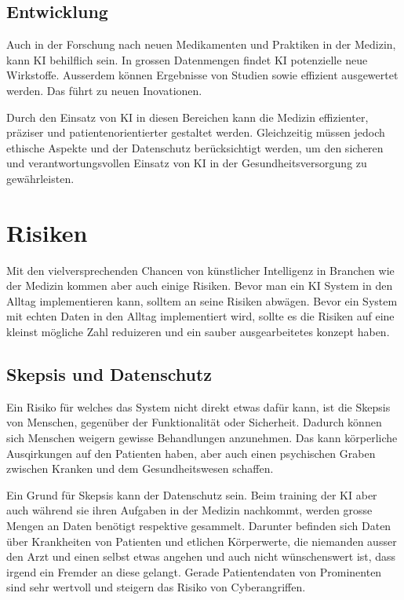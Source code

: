\subsection{\normalsize{Entwicklung}}
Auch in der Forschung nach neuen Medikamenten und Praktiken in der Medizin, kann KI behilflich sein. In grossen Datenmengen findet KI potenzielle neue Wirkstoffe.
Ausserdem können Ergebnisse von Studien sowie effizient ausgewertet werden. Das führt zu neuen Inovationen.

\vspace{3mm} \noindent
Durch den Einsatz von KI in diesen Bereichen kann die Medizin effizienter, präziser und patientenorientierter gestaltet werden. 
Gleichzeitig müssen jedoch ethische Aspekte und der Datenschutz berücksichtigt werden, um den sicheren und verantwortungsvollen Einsatz von KI in der Gesundheitsversorgung zu gewährleisten.

\vspace{2cm}
\section{Risiken}
Mit den vielversprechenden Chancen von künstlicher Intelligenz in Branchen wie der Medizin kommen aber auch einige Risiken. Bevor man ein KI System in den Alltag implementieren kann, solltem an seine Risiken abwägen.
Bevor ein System mit echten Daten in den Alltag implementiert wird, sollte es die Risiken auf eine kleinst mögliche Zahl reduizeren und ein sauber ausgearbeitetes konzept haben.


\subsection{\normalsize{Skepsis und Datenschutz}}
Ein Risiko für welches das System nicht direkt etwas dafür kann, ist die Skepsis von Menschen, gegenüber der Funktionalität oder Sicherheit. 
Dadurch können sich Menschen weigern gewisse Behandlungen anzunehmen. Das kann körperliche Ausqirkungen auf den Patienten haben, aber auch einen psychischen Graben zwischen Kranken und dem Gesundheitswesen schaffen.

Ein Grund für Skepsis kann der Datenschutz sein. Beim training der KI aber auch während sie ihren Aufgaben in der Medizin nachkommt, werden grosse Mengen an Daten benötigt respektive gesammelt. 
Darunter befinden sich Daten über Krankheiten von Patienten und etlichen Körperwerte, die niemanden ausser den Arzt und einen selbst etwas angehen und auch nicht wünschenswert ist, dass irgend ein Fremder an diese gelangt.
Gerade Patientendaten von Prominenten sind sehr wertvoll und steigern das Risiko von Cyberangriffen. 

